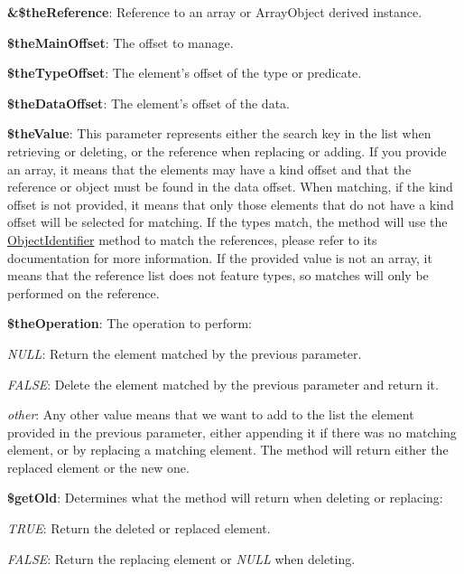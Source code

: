 \begin{DoxyItemize}
\item {\bfseries \&\$the\-Reference}\-: Reference to an array or Array\-Object derived instance. 
\item {\bfseries \$the\-Main\-Offset}\-: The offset to manage. 
\item {\bfseries \$the\-Type\-Offset}\-: The element's offset of the type or predicate. 
\item {\bfseries \$the\-Data\-Offset}\-: The element's offset of the data. 
\item {\bfseries \$the\-Value}\-: This parameter represents either the search key in the list when retrieving or deleting, or the reference when replacing or adding. If you provide an array, it means that the elements may have a kind offset and that the reference or object must be found in the data offset. When matching, if the kind offset is not provided, it means that only those elements that do not have a kind offset will be selected for matching. If the types match, the method will use the \hyperlink{class_c_persistent_unit_object_ac7bfe8f6475e61abb2e9de9c112cbfe6}{Object\-Identifier} method to match the references, please refer to its documentation for more information. If the provided value is not an array, it means that the reference list does not feature types, so matches will only be performed on the reference. 
\item {\bfseries \$the\-Operation}\-: The operation to perform\-: 
\begin{DoxyItemize}
\item {\itshape N\-U\-L\-L}\-: Return the element matched by the previous parameter. 
\item {\itshape F\-A\-L\-S\-E}\-: Delete the element matched by the previous parameter and return it. 
\item {\itshape other}\-: Any other value means that we want to add to the list the element provided in the previous parameter, either appending it if there was no matching element, or by replacing a matching element. The method will return either the replaced element or the new one. 
\end{DoxyItemize}
\item {\bfseries \$get\-Old}\-: Determines what the method will return when deleting or replacing\-: 
\begin{DoxyItemize}
\item {\itshape T\-R\-U\-E}\-: Return the deleted or replaced element. 
\item {\itshape F\-A\-L\-S\-E}\-: Return the replacing element or {\itshape N\-U\-L\-L} when deleting. 
\end{DoxyItemize}
\end{DoxyItemize}


